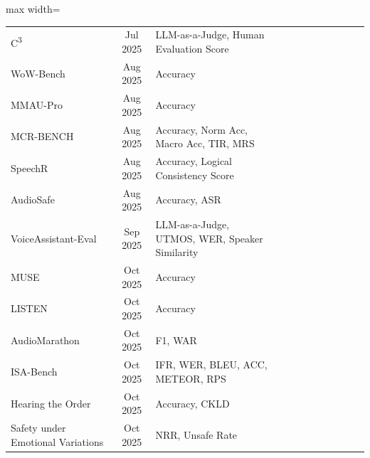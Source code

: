 \documentclass{llmxive}
\providecommand{\cmark}{\ding{51}}
\providecommand{\xmark}{\ding{55}}
\begin{document}
\begin{table}[htbp]
\begin{adjustbox}{max width=\textwidth}
\begin{tabular}{@{}lclccccccccc@{}}
C\textsuperscript{3}\cite{ma2025c3}      & Jul 2025 & LLM-as-a-Judge, Human Evaluation Score & \cmark & \cmark & \cmark & \xmark & \xmark & \xmark & \xmark & \cmark & \xmark \\
WoW-Bench\cite{kim2025wow}             & Aug 2025 & Accuracy & \cmark & \cmark & \xmark & \xmark & \xmark & \xmark & \xmark & \xmark & \xmark \\
MMAU-Pro\cite{kumar2025mmau}              & Aug 2025 & Accuracy & \cmark & \cmark & \cmark & \xmark & \xmark & \xmark & \xmark & \xmark & \xmark \\
MCR-BENCH\cite{wang2025audio}             & Aug 2025 & Accuracy, Norm Acc, Macro Acc, TIR, MRS & \cmark & \cmark & \xmark & \cmark & \xmark & \xmark & \xmark & \xmark & \xmark \\
SpeechR\cite{yang2025speechr}               & Aug 2025 & Accuracy, Logical Consistency Score & \xmark & \cmark & \xmark & \xmark & \xmark & \xmark & \xmark & \xmark & \xmark \\
AudioSafe\cite{lin2025hidden}   & Aug 2025 & Accuracy, ASR & \xmark & \xmark & \xmark & \xmark & \xmark & \xmark & \cmark & \cmark & \xmark \\
VoiceAssistant-Eval\cite{wang2025voiceassistant} & Sep 2025 & LLM-as-a-Judge, UTMOS, WER, Speaker Similarity & \cmark & \cmark & \cmark & \xmark & \xmark & \xmark & \cmark & \cmark & \xmark \\
MUSE\cite{carone2025muse}                  & Oct 2025 & Accuracy & \cmark & \cmark & \xmark & \xmark & \xmark & \xmark & \xmark & \xmark & \xmark \\
LISTEN\cite{chen2025audio}                & Oct 2025 & Accuracy & \cmark & \cmark & \xmark & \cmark & \xmark & \xmark & \xmark & \xmark & \xmark \\
AudioMarathon\cite{he2025audiomarathon}         & Oct 2025 & F1, WAR & \cmark & \cmark & \xmark & \xmark & \xmark & \xmark & \xmark & \xmark & \xmark \\
ISA-Bench\cite{li2025isa}             & Oct 2025 & IFR, WER, BLEU, ACC, METEOR, RPS & \cmark & \xmark & \xmark & \xmark & \xmark & \xmark & \cmark & \xmark & \xmark \\
Hearing the Order\cite{lin2025hearing}     & Oct 2025 & Accuracy, CKLD & \xmark & \xmark & \xmark & \xmark & \xmark & \xmark & \xmark & \cmark & \xmark \\
Safety under Emotional Variations\cite{feng2025investigating}
                      & Oct 2025 & NRR, Unsafe Rate & \xmark & \xmark & \xmark & \xmark & \xmark & \xmark & \cmark & \cmark & \xmark \\

\end{tabular}
\end{adjustbox}
\end{table}
\end{document}
